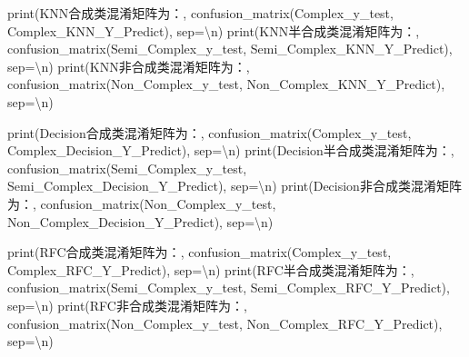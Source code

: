 \documentclass[
]{article}
\newenvironment{Shaded}{}{}
\newcommand{\BuiltInTok}[1]{#1}
\newcommand{\CharTok}[1]{\textcolor[rgb]{0.25,0.44,0.63}{#1}}
\newcommand{\NormalTok}[1]{#1}
\newcommand{\OperatorTok}[1]{\textcolor[rgb]{0.40,0.40,0.40}{#1}}
\newcommand{\StringTok}[1]{\textcolor[rgb]{0.25,0.44,0.63}{#1}}
\begin{document}
\begin{Shaded}
\begin{Highlighting}[]

\BuiltInTok{print}\NormalTok{(}\StringTok{\textquotesingle{}KNN合成类混淆矩阵为：\textquotesingle{}}\NormalTok{, confusion\_matrix(Complex\_y\_test, Complex\_KNN\_Y\_Predict), sep}\OperatorTok{=}\StringTok{\textquotesingle{}}\CharTok{\textbackslash{}n}\StringTok{\textquotesingle{}}\NormalTok{)}
\BuiltInTok{print}\NormalTok{(}\StringTok{\textquotesingle{}KNN半合成类混淆矩阵为：\textquotesingle{}}\NormalTok{, confusion\_matrix(Semi\_Complex\_y\_test, Semi\_Complex\_KNN\_Y\_Predict), sep}\OperatorTok{=}\StringTok{\textquotesingle{}}\CharTok{\textbackslash{}n}\StringTok{\textquotesingle{}}\NormalTok{)}
\BuiltInTok{print}\NormalTok{(}\StringTok{\textquotesingle{}KNN非合成类混淆矩阵为：\textquotesingle{}}\NormalTok{, confusion\_matrix(Non\_Complex\_y\_test, Non\_Complex\_KNN\_Y\_Predict), sep}\OperatorTok{=}\StringTok{\textquotesingle{}}\CharTok{\textbackslash{}n}\StringTok{\textquotesingle{}}\NormalTok{)}

\BuiltInTok{print}\NormalTok{(}\StringTok{\textquotesingle{}Decision合成类混淆矩阵为：\textquotesingle{}}\NormalTok{, confusion\_matrix(Complex\_y\_test, Complex\_Decision\_Y\_Predict), sep}\OperatorTok{=}\StringTok{\textquotesingle{}}\CharTok{\textbackslash{}n}\StringTok{\textquotesingle{}}\NormalTok{)}
\BuiltInTok{print}\NormalTok{(}\StringTok{\textquotesingle{}Decision半合成类混淆矩阵为：\textquotesingle{}}\NormalTok{, confusion\_matrix(Semi\_Complex\_y\_test, Semi\_Complex\_Decision\_Y\_Predict), sep}\OperatorTok{=}\StringTok{\textquotesingle{}}\CharTok{\textbackslash{}n}\StringTok{\textquotesingle{}}\NormalTok{)}
\BuiltInTok{print}\NormalTok{(}\StringTok{\textquotesingle{}Decision非合成类混淆矩阵为：\textquotesingle{}}\NormalTok{, confusion\_matrix(Non\_Complex\_y\_test, Non\_Complex\_Decision\_Y\_Predict), sep}\OperatorTok{=}\StringTok{\textquotesingle{}}\CharTok{\textbackslash{}n}\StringTok{\textquotesingle{}}\NormalTok{)}

\BuiltInTok{print}\NormalTok{(}\StringTok{\textquotesingle{}RFC合成类混淆矩阵为：\textquotesingle{}}\NormalTok{, confusion\_matrix(Complex\_y\_test, Complex\_RFC\_Y\_Predict), sep}\OperatorTok{=}\StringTok{\textquotesingle{}}\CharTok{\textbackslash{}n}\StringTok{\textquotesingle{}}\NormalTok{)}
\BuiltInTok{print}\NormalTok{(}\StringTok{\textquotesingle{}RFC半合成类混淆矩阵为：\textquotesingle{}}\NormalTok{, confusion\_matrix(Semi\_Complex\_y\_test, Semi\_Complex\_RFC\_Y\_Predict), sep}\OperatorTok{=}\StringTok{\textquotesingle{}}\CharTok{\textbackslash{}n}\StringTok{\textquotesingle{}}\NormalTok{)}
\BuiltInTok{print}\NormalTok{(}\StringTok{\textquotesingle{}RFC非合成类混淆矩阵为：\textquotesingle{}}\NormalTok{, confusion\_matrix(Non\_Complex\_y\_test, Non\_Complex\_RFC\_Y\_Predict), sep}\OperatorTok{=}\StringTok{\textquotesingle{}}\CharTok{\textbackslash{}n}\StringTok{\textquotesingle{}}\NormalTok{)}


\end{Highlighting}
\end{Shaded}
\end{document}
